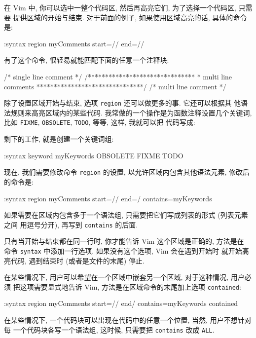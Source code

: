 在 Vim 中, 你可以选中一整个代码区, 然后再高亮它们, 为了选择一个代码区, 只需要
提供区域的开始与结束. 对于前面的例子, 如果使用区域高亮的话, 具体的命令是:
\begin{vimcode}
:syntax region myComments start=/\/\*/ end=/\*\//
\end{vimcode}
有了这个命令, 很轻易就能匹配下面的任意一个注释块:
\begin{vimcode}
/* single line comment */
/*******************************
 *  multi line comments
 *******************************/
/* multi line comment
 */
\end{vimcode}

除了设置区域开始与结束, 选项 \texttt{region} 还可以做更多的事. 它还可以根据其
他语法规则来高亮区域内的某些代码. 我常做的一个操作是为函数注释设置几个关键词,
比如 \texttt{FIXME}, \texttt{OBSOLETE}, \texttt{TODO}, 等等, 这样, 我就可以把
代码写成:
\begin{vimcode}
/*  function: splitString()
 *  args    : string
 *  OBSOLETE
 */
function splitString(string) {
...
\end{vimcode}
剩下的工作, 就是创建一个关键词组:
\begin{vimcode}
:syntax keyword myKeywords OBSOLETE FIXME TODO
\end{vimcode}
现在, 我们需要修改命令 \texttt{region} 的设置, 以允许区域内包含其他语法元素,
修改后的命令是:
\begin{vimcode}
:syntax region myComments start=/\/\*/ end=\/\*\// contains=myKeywords
\end{vimcode}

如果需要在区域内包含多于一个语法组, 只需要把它们写成列表的形式 (列表元素之间
用逗号分开), 再写到 \texttt{contains} 的后面.

\begin{warning}
    只有当开始与结束都在同一行时, 你才能告诉 Vim 这个区域是正确的, 方法是在
    命令 \texttt{syntax} 中添加一行选项. 如果没有这个选项, Vim 会在遇到开始时
    就开始高亮代码, 遇到结束时 (或者是文件的末尾) 停止.
\end{warning}

在某些情况下, 用户可以希望在一个区域中嵌套另一个区域, 对于这种情况, 用户必须
把这项需要显式地告诉 Vim, 方法是在区域命令的末尾加上选项 \texttt{contained}:
\begin{vimcode}
:syntax region myComments start=/\/\*/ end\/\*\// contains=myKeywords
contained
\end{vimcode}

在某些情况下, 一个代码块可以出现在代码中的任意一个位置, 当然, 用户不想针对每
一个代码块各写一个语法组, 这时候, 只需要把 \texttt{contains} 改成 \texttt{ALL}.

